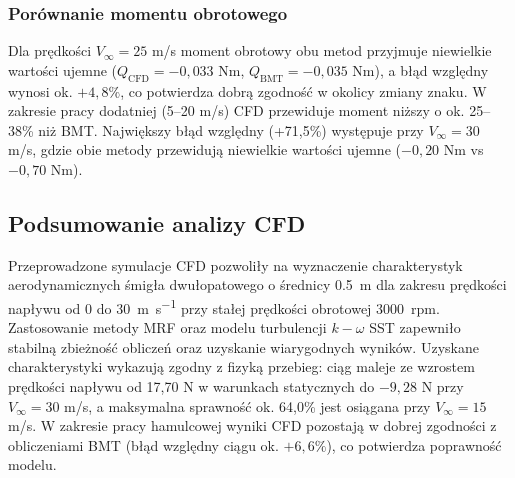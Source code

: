 \documentclass[12pt,a4paper,twoside]{article}
\begin{document}
	\subsubsection{Porównanie momentu obrotowego}
	Dla prędkości \(V_\infty = 25\) m/s moment obrotowy obu metod przyjmuje niewielkie wartości ujemne (\(Q_{\text{CFD}} = -0{,}033\) Nm, \(Q_{\text{BMT}} = -0{,}035\) Nm), a błąd względny wynosi ok. \(+4{,}8\%\), co potwierdza dobrą zgodność w okolicy zmiany znaku. W zakresie pracy dodatniej (5--20 m/s) CFD przewiduje moment niższy o ok. 25--38\% niż BMT. Największy błąd względny (+71,5\%) występuje przy \(V_\infty = 30\) m/s, gdzie obie metody przewidują niewielkie wartości ujemne (\(-0{,}20\) Nm vs \(-0{,}70\) Nm).
	
	\subsection{Podsumowanie analizy CFD}
	Przeprowadzone symulacje CFD pozwoliły na wyznaczenie charakterystyk aerodynamicznych śmigła dwułopatowego o średnicy \SI{0.5}{\meter} dla zakresu prędkości napływu od 0 do \SI{30}{\meter\per\second} przy stałej prędkości obrotowej \SI{3000}{rpm}. Zastosowanie metody MRF oraz modelu turbulencji \(k-\omega\) SST zapewniło stabilną zbieżność obliczeń oraz uzyskanie wiarygodnych wyników. Uzyskane charakterystyki wykazują zgodny z fizyką przebieg: ciąg maleje ze wzrostem prędkości napływu od 17,70 N w warunkach statycznych do \(-9{,}28\) N przy \(V_\infty = 30\) m/s, a maksymalna sprawność ok. 64,0\% jest osiągana przy \(V_\infty = 15\) m/s. W zakresie pracy hamulcowej wyniki CFD pozostają w dobrej zgodności z obliczeniami BMT (błąd względny ciągu ok. \(+6{,}6\%\)), co potwierdza poprawność modelu.
	
\end{document}
